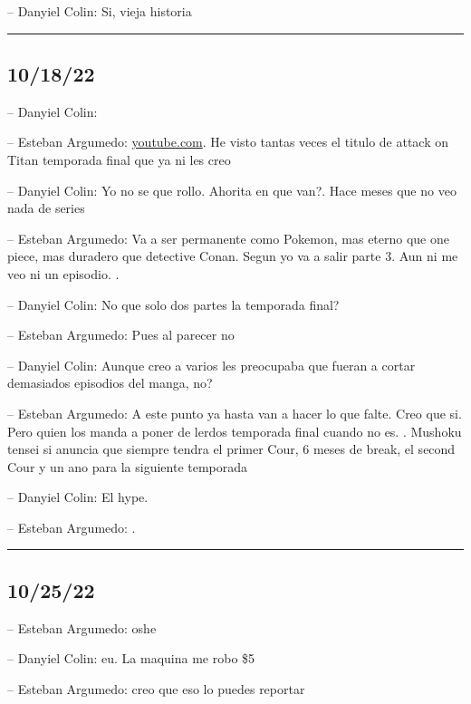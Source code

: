 -- Danyiel Colin: Si, vieja historia

\begin{center}\rule{0.5\linewidth}{0.5pt}\end{center}

\hypertarget{section-159}{%
\subsection{10/18/22}\label{section-159}}

-- Danyiel Colin:

-- Esteban Argumedo:
\href{https://youtube.com/shorts/NnDslc2t0kw?feature=share}{youtube.com}.
He visto tantas veces el titulo de attack on Titan temporada final que
ya ni les creo

-- Danyiel Colin: Yo no se que rollo. Ahorita en que van?. Hace meses
que no veo nada de series

-- Esteban Argumedo: Va a ser permanente como Pokemon, mas eterno que
one piece, mas duradero que detective Conan. Segun yo va a salir parte
3. Aun ni me veo ni un episodio. .

-- Danyiel Colin: No que solo dos partes la temporada final?

-- Esteban Argumedo: Pues al parecer no

-- Danyiel Colin: Aunque creo a varios les preocupaba que fueran a
cortar demasiados episodios del manga, no?

-- Esteban Argumedo: A este punto ya hasta van a hacer lo que falte.
Creo que si. Pero quien los manda a poner de lerdos temporada final
cuando no es. . Mushoku tensei si anuncia que siempre tendra el primer
Cour, 6 meses de break, el second Cour y un ano para la siguiente
temporada

-- Danyiel Colin: El hype.

-- Esteban Argumedo: .

\begin{center}\rule{0.5\linewidth}{0.5pt}\end{center}

\hypertarget{section-160}{%
\subsection{10/25/22}\label{section-160}}

-- Esteban Argumedo: oshe

-- Danyiel Colin: eu. La maquina me robo \$5

-- Esteban Argumedo: creo que eso lo puedes reportar

